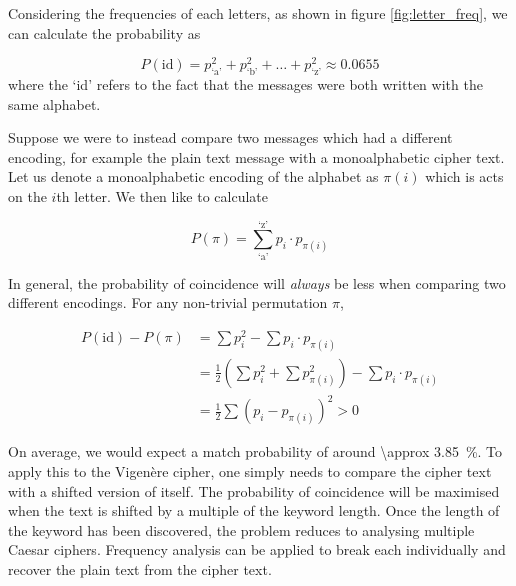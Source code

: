 Considering the frequencies of each letters, as shown in figure \ref{fig:letter_freq}, we can calculate the probability as

\begin{equation}
	P(\text{id}) = p_\text{`a'}^2 + p_\text{`b'}^2 + \dots +p_\text{`z'}^2 \approx 0.0655
\end{equation}
where the `id' refers to the fact that the messages were both written with the same alphabet.

Suppose we were to instead compare two messages which had a different encoding, for example the plain text message with a monoalphabetic cipher text. Let us denote a monoalphabetic encoding of the alphabet as $\pi(i)$ which is acts on the $i$th letter. We then like to calculate

\begin{equation}
	P(\pi) = \sum_\text{`a'}^\text{`z'} p_i \cdot p_{\pi(i)}
\end{equation}

In general, the probability of coincidence will \emph{always} be less when comparing two different encodings. For any non-trivial permutation $\pi$,

\begin{align}
	P(\text{id}) - P(\pi) &= \sum p_i^2 - \sum p_i \cdot p_{\pi(i)}\\
	&= \frac{1}{2}\left(\sum p_i^2 + \sum p_{\pi(i)}^2\right) - \sum p_i \cdot p_{\pi(i)}\\
	&= \frac{1}{2} \sum (p_i - p_{\pi(i)})^2 > 0
\end{align}

On average, we would expect a match probability of around  \SI{\approx 3.85}{\percent}. To apply this to the Vigen\`{e}re cipher, one simply needs to compare the cipher text with a shifted version of itself. The probability of coincidence will be maximised when the text is shifted by a multiple of the keyword length. Once the length of the keyword has been discovered, the problem reduces to analysing multiple Caesar ciphers. Frequency analysis can be applied to break each individually and recover the plain text from the cipher text. 

%

